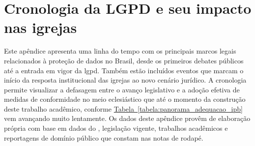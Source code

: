 \chapter{Cronologia da LGPD e seu impacto nas igrejas}
\label{apendice:cronologia-lgpd}

Este apêndice apresenta uma linha do tempo com os principais marcos legais relacionados à proteção de dados no Brasil, desde os primeiros debates públicos até a entrada em vigor da \gls{lgpd}.  Também estão incluídos eventos que marcam o início da resposta institucional das igrejas ao novo cenário jurídico. A cronologia permite visualizar a defasagem entre o avanço legislativo e a adoção efetiva de medidas de conformidade no meio eclesiástico que até o momento da construção deste trabalho acadêmico, conforme \hyperref[tabela:panorama_adequacao_ipb]{Tabela~\ref*{tabela:panorama_adequacao_ipb}} vem avançando muito lentamente. Os dados deste apêndice provêm de elaboração própria com base em dados do , legislação vigente, trabalhos acadêmicos e reportagens de domínio público que constam nas notas de rodapé.

